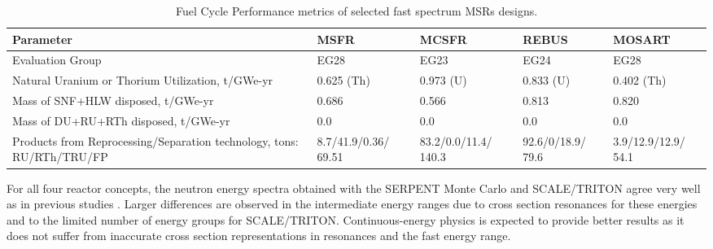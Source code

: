 \documentclass{anstrans}
\begin{document}
\begin{table}[h!]
  \centering
  \caption{Fuel Cycle Performance metrics of selected fast spectrum \glspl{MSR} designs.}
  \label{table:metrics} 
  \begin{tabular}{p{} p{} p{} p{} p{}} \toprule 
   Parameter &  \gls{MSFR} & \gls{MCSFR} & REBUS & \gls{MOSART} \\ \midrule
   Evaluation Group	&  EG28 & EG23 & EG24 & EG28   \\ 
   Natural Uranium or Thorium Utilization, t/GWe-yr & 0.625 (Th) & 0.973 (U) & 0.833 (U) & 0.402 (Th) \\
   Mass of \gls{SNF}+\gls{HLW} disposed, t/GWe-yr & 0.686 & 0.566 & 0.813 &  0.820 \\
   Mass of DU+RU+RTh disposed, t/GWe-yr & 0.0 & 0.0 & 0.0 &  0.0 \\
   Products from Reprocessing/Separation technology, tons: \gls{RU}/\gls{RTh}/\gls{TRU}/\gls{FP} &
   8.7/41.9/0.36/ 69.51 &  83.2/0.0/11.4/ 140.3 & 92.6/0/18.9/ 79.6 & 3.9/12.9/12.9/ 54.1  \\
 \bottomrule 
  \end{tabular}
  \vspace{-0.2in}
\end{table}

For all four reactor concepts, the neutron energy spectra obtained with the SERPENT Monte Carlo and SCALE/TRITON agree very well as in previous studies \cite{betzler_fuel_2018}. Larger differences are observed in the intermediate energy ranges due to cross section resonances for these energies and to the limited number of energy groups for SCALE/TRITON. Continuous-energy physics is expected to provide better results as it does not suffer from inaccurate cross section representations in resonances and the fast energy range.
\end{document}
